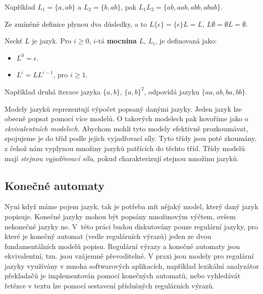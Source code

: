 \begin{example}
    Například $L_1=\{a,ab\}$ a $L_2=\{b,ab\}$, pak $L_1 L_2 = \{ ab,aab,abb,abab \}$.
\end{example}

Ze zmíněné definice plynou dva důsledky, a to $L\{ \epsilon \} = \{ \epsilon \} L=L$, $L \emptyset = \emptyset L = \emptyset $.

\begin{definition}
    Nechť $L$ je jazyk. Pro $i \ge 0$, $i$-tá \textbf{mocnina} $L$, $L_i$, je definovaná jako:
    \begin{itemize}
        \item $L^0 = \epsilon $.
        \item $L^i = LL^{i-1}$, pro $i \ge 1$.
    \end{itemize}
\end{definition}

\begin{example}
    Například druhá iterace jazyka $\{ a,b \}$, $\{ a,b \}^2$, odpovídá jazyku $\{ aa,ab,ba,bb \} $.
\end{example}

Modely jazyků reprezentují výpočet popsaný danými jazyky. Jeden jazyk lze obecně popsat pomocí více modelů. O takových modelech pak hovoříme jako o \textit{ekvivalentních modelech}. Abychom mohli tyto modely efektivně prozkoumávat, spojujeme je do tříd podle jejich vyjadřovací síly. Tyto třídy jsou poté zkoumány, z čehož nám vyplynou množiny jazyků patřících do těchto tříd. Třídy modelů mají \textit{stejnou vyjadřovací sílu}, pokud charakterizují stejnou množinu jazyků.

\subsection{Konečné automaty}

Nyní když máme pojem jazyk, tak je potřeba mít nějaký model, který daný jazyk popisuje. Konečné jazyky mohou být popsány množinovým výčtem, ovšem nekonečné jazyky ne. V~této práci budou diskutovány pouze regulární jazyky, pro které je konečný automat (vedle regulárních výrazů) jeden ze dvou fundamentálních modelů popisu. Regulární výrazy a konečné automaty jsou ekvivalentní, tzn. jsou vzájemně převoditelné. V praxi jsou modely pro regulární jazyky využívány v mnoha softwarových aplikacích, například lexikální analyzátor překladačů je implementován pomocí konečných automatů, nebo vyhledávát řetězce v textu lze pomocí sestavení příslušných regulárních výrazů.

